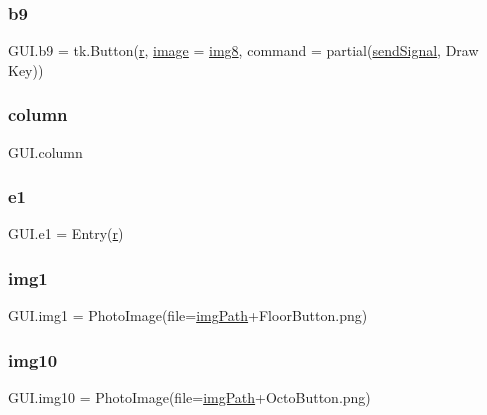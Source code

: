 \subsubsection{\texorpdfstring{b9}{b9}}
{\footnotesize\ttfamily G\+U\+I.\+b9 = tk.\+Button(\mbox{\hyperlink{_s_d_l__opengl_8h_a42ce7cdc612e53abee15043f80220d97}{r}}, \mbox{\hyperlink{_s_d_l__opengl_8h_a0a221b005894579fea3b9eb7bfc2ee71}{image}} = \mbox{\hyperlink{namespace_g_u_i_a16cb8d3ad11106b26025ddbf102b8a6f}{img8}}, command = partial(\mbox{\hyperlink{namespace_g_u_i_ae82f740e6453cdd542b52ede1560c2c3}{send\+Signal}}, \textquotesingle{}Draw Key\textquotesingle{}))}

\mbox{\label{namespace_g_u_i_a4d9166e323570c16afa5de2e7bd788af}} 
\subsubsection{\texorpdfstring{column}{column}}
{\footnotesize\ttfamily G\+U\+I.\+column}

\mbox{\label{namespace_g_u_i_af268557bd2f393a6fce1161af8ab0300}} 
\subsubsection{\texorpdfstring{e1}{e1}}
{\footnotesize\ttfamily G\+U\+I.\+e1 = Entry(\mbox{\hyperlink{_s_d_l__opengl_8h_a42ce7cdc612e53abee15043f80220d97}{r}})}

\mbox{\label{namespace_g_u_i_a2b9af2e6ceeadebce40ff8171633d86c}} 
\subsubsection{\texorpdfstring{img1}{img1}}
{\footnotesize\ttfamily G\+U\+I.\+img1 = Photo\+Image(file=\mbox{\hyperlink{namespace_g_u_i_a293e22c0a27a45862ad50fcb8ed12f15}{img\+Path}}+\textquotesingle{}Floor\+Button.\+png\textquotesingle{})}

\mbox{\label{namespace_g_u_i_ae7bae4d0c7bb1a98517fed2294b60f46}} 
\subsubsection{\texorpdfstring{img10}{img10}}
{\footnotesize\ttfamily G\+U\+I.\+img10 = Photo\+Image(file=\mbox{\hyperlink{namespace_g_u_i_a293e22c0a27a45862ad50fcb8ed12f15}{img\+Path}}+\textquotesingle{}Octo\+Button.\+png\textquotesingle{})}

